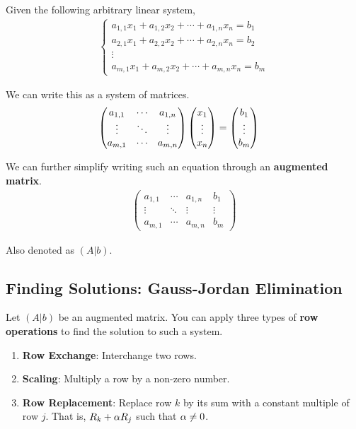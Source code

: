 \begin{notation}
    Given the following arbitrary linear system,
    \begin{align*}
        \begin{cases}
            a_{1,1}x_1 + a_{1,2}x_2 + \cdots + a_{1, n} x_n = b_1 \\
            a_{2,1}x_1 + a_{2,2}x_2 + \cdots + a_{2, n} x_n = b_2 \\
            \vdots \\
            a_{m,1}x_1 + a_{m,2}x_2 + \cdots + a_{m, n} x_n = b_m 
        \end{cases}
    \end{align*}

    We can write this as a system of matrices.
    \begin{align*}
        \begin{pmatrix}
            a_{1,1} & \cdots & a_{1, n} \\
            \vdots & \ddots & \vdots \\
            a_{m, 1} & \cdots & a_{m, n}
        \end{pmatrix}
        \begin{pmatrix} x_1 \\ \vdots \\ x_n \end{pmatrix} &=
        \begin{pmatrix} b_1 \\ \vdots \\ b_m \end{pmatrix}
    \end{align*}

    We can further simplify writing such an equation through an \textbf{augmented matrix}.
    \begin{align*}
        \left(\begin{array}{ccc|c}
            a_{1,1} & \cdots & a_{1,n} & b_1 \\
            \vdots  & \ddots & \vdots  & \vdots \\
            a_{m,1} & \cdots & a_{m,n} & b_m
        \end{array}\right)
    \end{align*}

    Also denoted as $(A | b)$.
\end{notation}

\subsection{Finding Solutions: Gauss-Jordan Elimination}
\begin{definition}
    Let $(A| b)$ be an augmented matrix. You can apply three types of \textbf{row operations} to find the solution to such a system.
    \begin{enumerate}
        \item \textbf{Row Exchange}: Interchange two rows.
        \item \textbf{Scaling}: Multiply a row by a non-zero number.
        \item \textbf{Row Replacement}: Replace row $k$ by its sum with a constant multiple of row $j$. That is, $R_k + \alpha R_j$ such that $\alpha \neq 0$. 
    \end{enumerate}
\end{definition}

